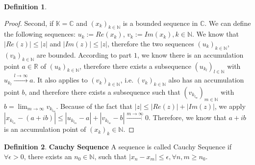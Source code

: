 \documentclass{article}
\theoremstyle{definition}
\newtheorem{defi}{Definition}[subsection]
\begin{document}
\begin{defi}
\begin{proof}
Second, if $\mathbb{K}=\mathbb{C}$ and $(x_k)_{k\in\mathbb{N}}$ is a bounded sequence in $\mathbb{C}$. We can define the following sequences: $u_k := Re(x_k)$, $v_k := Im(x_k), k\in\mathbb{N}$. We know that $|Re(z)|\leq |z|$ and $|Im(z)|\leq |z|$, therefore the two sequences $(u_k)_{k\in\mathbb{N}}$, $(v_k)_{k\in\mathbb{N}}$ are bounded. According to part $1$, we know there is an accumulation point $a\in\mathbb{R}$ of $(u_k)_{k\in\mathbb{N}}$, therefore there exists a subsequence $(u_{k_{l}})_{l\in\mathbb{N}}$ with $u_{k_{l}}\xrightarrow{l\to\infty}a$. It also applies to $(v_{k})_{k\in\mathbb{N}}$, i.e. $(v_{k})_{k\in\mathbb{N}}$ also has an accumulation point $b$, and therefore there exists a subsequence such that $(v_{k_{l_{m}}})_{m\in\mathbb{N}}$ with $b=\lim_{m\to\infty}v_{k_{l_{m}}}$. Because of the fact that $|z|\leq |Re(z)|+|Im(z)|$, we apply $|x_{k_{l_{m}}}-(a+ib)| \leq |u_{k_{l_{m}}}-a| + |v_{k_{l_{m}}}-b| \xrightarrow{m\to\infty}0$. Therefore, we know that $a+ib$ is an accumulation point of $(x_k)_k\in\mathbb{N}$.

\end{proof}
\end{defi}

\begin{defi}
\textbf{Cauchy Sequence} A sequence is called Cauchy Sequence if $\forall \epsilon>0$, there exists an $n_0\in\mathbb{N}$, such that $|x_n-x_m|\leq \epsilon, \forall n,m \geq n_0$.
\end{defi}
\end{document}
